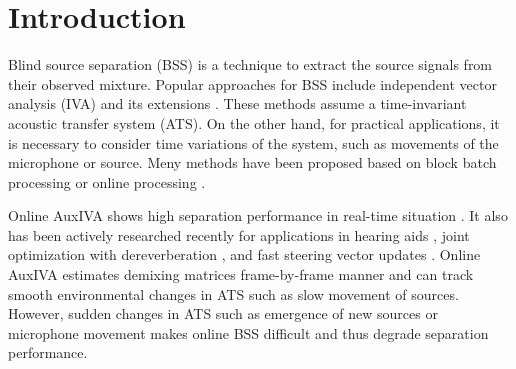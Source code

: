 \documentclass[sip,biber]{now-journal}
\begin{document}
\section{Introduction}\label{sec:intro}
%
%
Blind source separation (BSS) \cite{Makino:2018:ASS} is a technique to extract the source signals from their observed mixture.
Popular approaches for BSS include independent vector analysis (IVA) \cite{Kim:2006:ASLP,Hiroe:2006:ICA} and its extensions \cite{Kitamura:2016:ASLP,Nugraha:2020:SPL,Brendel:2020:SP}.
These methods assume a time-invariant acoustic transfer system (ATS).
On the other hand, for practical applications, it is necessary to consider time variations of the system, such as movements of the microphone or source.
Meny methods have been proposed based on block batch processing \cite{Koldovsky:2019:ICASSP,Koldovsky:2021:SP,Jansky:2022:ASMP} or online processing \cite{Kim:2010:CASI,Taniguchi:2014:HSCMA}.

Online AuxIVA shows high separation performance in real-time situation \cite{Taniguchi:2014:HSCMA}.
It also has been actively researched recently for applications in hearing aids \cite{Sunohara:2017:ICASSP}, joint optimization with dereverberation \cite{Ueda:2021:ICASSP}, and fast steering vector updates \cite{Nakashima:2023:ICASSP}.
Online AuxIVA estimates demixing matrices frame-by-frame manner and can track smooth environmental changes in ATS such as slow movement of sources.
However, sudden changes in ATS such as emergence of new sources or microphone movement makes online BSS difficult and thus degrade separation performance.
\end{document}
